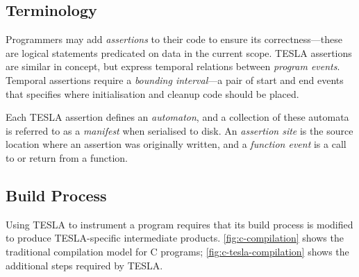 \subsection{Terminology} \label{sec:terminology}

Programmers may add \emph{assertions} to their code to ensure its
correctness---these are logical statements predicated on data in the current
scope. TESLA assertions are similar in concept, but express temporal relations
between \emph{program events}. Temporal assertions require a \emph{bounding
interval}---a pair of start and end events that specifies where initialisation
and cleanup code should be placed.

Each TESLA assertion defines an \emph{automaton}, and a collection of
these automata is referred to as a \emph{manifest} when serialised to
disk. An \emph{assertion site} is the source location where an assertion
was originally written, and a \emph{function event} is a call to or
return from a function.

\subsection{Build Process} \label{sec:build-tesla}

Using TESLA to instrument a program requires that its build process is modified
to produce TESLA-specific intermediate products. \autoref{fig:c-compilation}
shows the traditional compilation model for C programs;
\autoref{fig:c-tesla-compilation} shows the additional steps required by TESLA.

